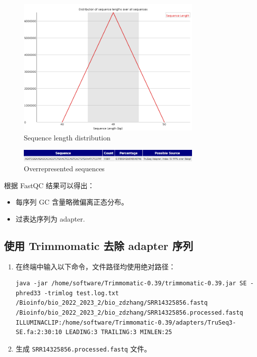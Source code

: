 \documentclass[UTF8]{ctexart}
\begin{document}
\begin{figure}[!htb]
	\centering
	\includegraphics[width=0.8\textwidth]{img/SRR14325859_FastQC_Origin_img/sequence_length_distribution.png}	%
	\caption{Sequence length distribution\protect}    %
\end{figure}

\begin{figure}[!htb]
	\centering
	\includegraphics[width=0.8\textwidth]{img/SRR14325859_FastQC_Origin_img/overrepresented_sequences.png}	%
	\caption{Overrepresented sequences\protect}    %
\end{figure}

\clearpage

根据 FastQC 结果可以得出：
\begin{itemize}
	\item 每序列 GC 含量略微偏离正态分布。
	\item 过表达序列为 adapter.
\end{itemize}

\subsection{ 使用 Trimmomatic 去除 adapter 序列}

\begin{enumerate}
	\item 在终端中输入以下命令，文件路径均使用绝对路径：
	\begin{lstlisting}
java -jar /home/software/Trimmomatic-0.39/trimmomatic-0.39.jar SE -phred33 -trimlog test.log.txt /Bioinfo/bio_2022_2023_2/bio_zdzhang/SRR14325856.fastq /Bioinfo/bio_2022_2023_2/bio_zdzhang/SRR14325856.processed.fastq ILLUMINACLIP:/home/software/Trimmomatic-0.39/adapters/TruSeq3-SE.fa:2:30:10 LEADING:3 TRAILING:3 MINLEN:25 
	\end{lstlisting}
	\item 生成 \verb|SRR14325856.processed.fastq| 文件。
\end{enumerate}
\end{document}
